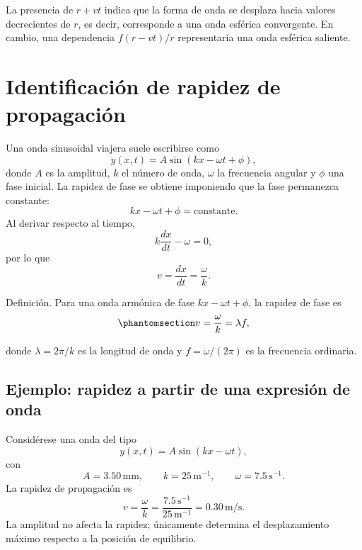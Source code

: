 \documentclass[
  letterpaper,
  DIV=11,
  numbers=noendperiod]{scrreprt}
\begin{document}
La presencia de \(r+vt\) indica que la forma de onda se desplaza hacia
valores decrecientes de \(r\), es decir, corresponde a una onda esférica
convergente. En cambio, una dependencia \(f(r-vt)/r\) representaría una
onda esférica saliente.

\section{Identificación de rapidez de
propagación}\label{identificaciuxf3n-de-rapidez-de-propagaciuxf3n}

Una onda sinusoidal viajera suele escribirse como \[
y(x,t)=A\sin(kx-\omega t+\phi),
\] donde \(A\) es la amplitud, \(k\) el número de onda, \(\omega\) la
frecuencia angular y \(\phi\) una fase inicial. La rapidez de fase se
obtiene imponiendo que la fase permanezca constante: \[
kx-\omega t+\phi=\text{constante}.
\] Al derivar respecto al tiempo, \[
k\frac{dx}{dt}-\omega=0,
\] por lo que \[
v=\frac{dx}{dt}=\frac{\omega}{k}.
\]

\begin{tcolorbox}[enhanced jigsaw, bottomrule=.15mm, rightrule=.15mm, colframe=quarto-callout-note-color-frame, leftrule=.75mm, breakable, arc=.35mm, toprule=.15mm, left=2mm, colback=white, opacityback=0]

Definición. Para una onda armónica de fase \(kx-\omega t+\phi\), la
rapidez de fase es \begin{equation}\phantomsection\label{eq-wave-speed}{
v=\frac{\omega}{k}=\lambda f,
}\end{equation}

\end{tcolorbox}

donde \(\lambda=2\pi/k\) es la longitud de onda y \(f=\omega/(2\pi)\) es
la frecuencia ordinaria.

\subsection{Ejemplo: rapidez a partir de una expresión de
onda}\label{ejemplo-rapidez-a-partir-de-una-expresiuxf3n-de-onda}

Considérese una onda del tipo \[
y(x,t)=A\sin(kx-\omega t),
\] con \[
A=3.50\,\text{mm}, \qquad k=25\,\text{m}^{-1}, \qquad \omega=7.5\,\text{s}^{-1}.
\] La rapidez de propagación es \[
v=\frac{\omega}{k}=\frac{7.5\,\text{s}^{-1}}{25\,\text{m}^{-1}}=0.30\,\text{m/s}.
\] La amplitud no afecta la rapidez; únicamente determina el
desplazamiento máximo respecto a la posición de equilibrio.
\end{document}

